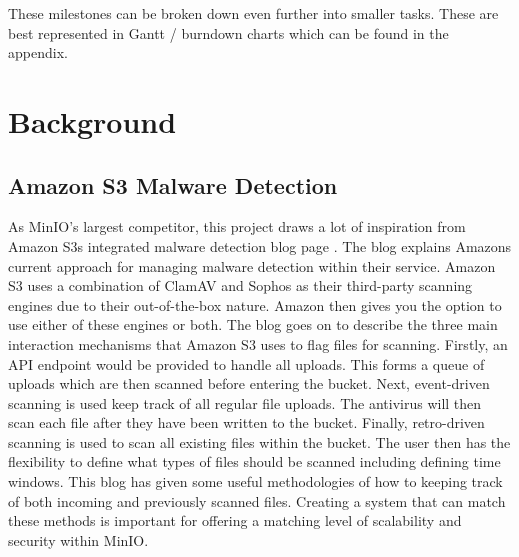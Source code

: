 \documentclass[12pt, conference, final, a4paper, onecolumn, compsoc]{IEEEtran}
\begin{document}
These milestones can be broken down even further into smaller tasks. These are
best represented in Gantt / burndown charts which can be found in the appendix.

\section{Background}




\subsection*{Amazon S3 Malware Detection} %

As MinIO's largest competitor, this project draws a lot of inspiration from
Amazon S3s integrated malware detection blog page \citep{amazon-md}. The blog
explains Amazons current approach for managing malware detection within their
service. Amazon S3 uses a combination of ClamAV and Sophos as their third-party
scanning engines due to their out-of-the-box nature. Amazon then gives you the
option to use either of these engines or both. The blog goes on to describe the
three main interaction mechanisms that Amazon S3 uses to flag files for
scanning. Firstly, an API endpoint would be provided to handle all uploads. This
forms a queue of uploads which are then scanned before entering the bucket.
Next, event-driven scanning is used keep track of all regular file uploads. The
antivirus will then scan each file after they have been written to the bucket.
Finally, retro-driven scanning is used to scan all existing files within the
bucket. The user then has the flexibility to define what types of files should
be scanned including defining time windows. This blog has given some useful
methodologies of how to keeping track of both incoming and previously scanned
files. Creating a system that can match these methods is important for offering
a matching level of scalability and security within MinIO.

\end{document}
